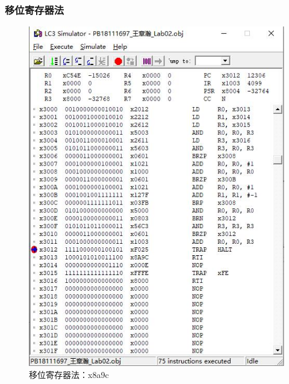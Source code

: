 \documentclass[UTF8]{article}
\begin{document}
	\subsubsection{移位寄存器法}
	\begin{figure}[H]
		\centering
		\includegraphics[width=0.4\linewidth]{x8a9c_1.jpg}
		\caption{移位寄存器法：x8a9c}
		\label{x8a9c_1}
	\end{figure}\par
\end{document}
